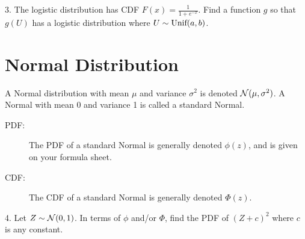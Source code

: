 \documentclass{article}
\begin{document}
    

3. The logistic distribution has CDF $F(x) = \frac{1}{1+e^{-x}}$. Find a function $g$ so that $g(U)$ has a logistic distribution where $U \sim \textrm{Unif}(a,b)$. \\


\section{Normal Distribution}

A Normal distribution with mean $\mu$ and variance $\sigma^2$ is denoted $\mathcal{N}(\mu, \sigma^2)$. A Normal with mean 0 and variance 1 is called a standard Normal.

\begin{description}

\item[PDF:] The PDF of a standard Normal is generally denoted $\phi(z)$, and is given on your formula sheet.

\item[CDF:] The CDF of a standard Normal is generally denoted $\Phi(z)$.

\end{description}
4. Let $Z \sim \mathcal{N}(0,1)$. In terms of $\phi$ and/or $\Phi$, find the PDF of $(Z+c)^2$ where $c$ is any constant.

\end{document}

